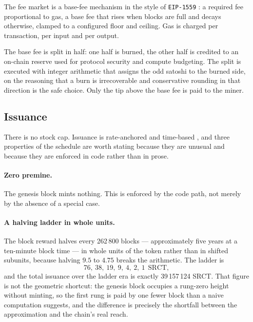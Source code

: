 \documentclass{article}
\begin{document}
The fee market is a base-fee mechanism in the style of \texttt{EIP-1559}
\cite{buterin2020eip1559}: a required fee proportional to gas, a base fee that
rises when blocks are full and decays otherwise, clamped to a configured floor
and ceiling. Gas is charged per transaction, per input and per output.

The base fee is split in half: one half is burned, the other half is credited
to an on-chain reserve used for protocol security and compute budgeting. The
split is executed with integer arithmetic that assigns the odd satoshi to the
burned side, on the reasoning that a burn is irrecoverable and conservative
rounding in that direction is the safe choice. Only the tip above the base fee
is paid to the miner.

\subsection{Issuance}
\label{sec:issuance}

There is no stock cap. Issuance is rate-anchored and time-based
\cite{srct-monetary}, and three properties of the schedule are worth stating
because they are unusual and because they are enforced in code rather than in
prose.

\paragraph{Zero premine.} The genesis block mints nothing. This is enforced by
the code path, not merely by the absence of a special case.

\paragraph{A halving ladder in whole units.} The block reward halves every
262\,800 blocks --- approximately five years at a ten-minute block time --- in
whole units of the token rather than in shifted subunits, because halving
$9.5$ to $4.75$ breaks the arithmetic. The ladder is
\begin{equation}
76,\ 38,\ 19,\ 9,\ 4,\ 2,\ 1 \ \ \mathrm{SRCT},
\label{eq:ladder}
\end{equation}
and the total issuance over the ladder era is exactly 39\,157\,124 SRCT. That
figure is not the geometric shortcut: the genesis block occupies a rung-zero
height without minting, so the first rung is paid by one fewer block than a
naive computation suggests, and the difference is precisely the shortfall
between the approximation and the chain's real reach.
\end{document}
